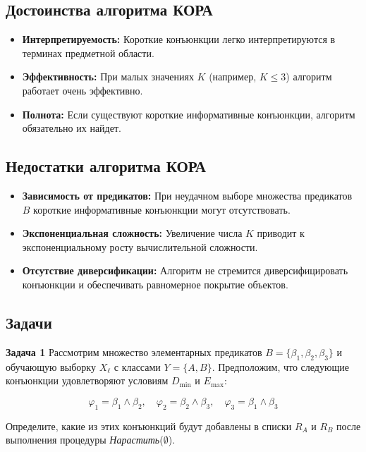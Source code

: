\subsection{Достоинства алгоритма КОРА}

\begin{itemize}
    \item \textbf{Интерпретируемость:} Короткие конъюнкции легко интерпретируются в терминах предметной области.
    \item \textbf{Эффективность:} При малых значениях \(K\) (например, \(K \leq 3\)) алгоритм работает очень эффективно.
    \item \textbf{Полнота:} Если существуют короткие информативные конъюнкции, алгоритм обязательно их найдет.
\end{itemize}

\subsection{Недостатки алгоритма КОРА}

\begin{itemize}
    \item \textbf{Зависимость от предикатов:} При неудачном выборе множества предикатов \(B\) короткие информативные конъюнкции могут отсутствовать.
    \item \textbf{Экспоненциальная сложность:} Увеличение числа \(K\) приводит к экспоненциальному росту вычислительной сложности.
    \item \textbf{Отсутствие диверсификации:} Алгоритм не стремится диверсифицировать конъюнкции и обеспечивать равномерное покрытие объектов.
\end{itemize}

\subsection{Задачи}

\textbf{Задача 1}  
Рассмотрим множество элементарных предикатов \( B = \{ \beta_1, \beta_2, \beta_3 \} \) и обучающую выборку \( X_\ell \) с классами \( Y = \{A, B\} \). Предположим, что следующие конъюнкции удовлетворяют условиям \( D_{\text{min}} \) и \( E_{\text{max}} \):

\[
\varphi_1 = \beta_1 \wedge \beta_2, \quad \varphi_2 = \beta_2 \wedge \beta_3, \quad \varphi_3 = \beta_1 \wedge \beta_3
\]

Определите, какие из этих конъюнкций будут добавлены в списки \( R_A \) и \( R_B \) после выполнения процедуры \textit{Нарастить}(\(\emptyset\)).

